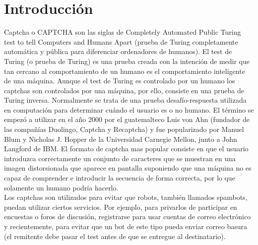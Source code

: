 \documentclass[conference]{IEEEtran}
\begin{document}
\section{Introducción}
Captcha o CAPTCHA son las siglas de Completely Automated Public Turing test to tell Computers and Humans Apart (prueba de Turing completamente automática y pública para diferenciar ordenadores de humanos). El test de Turing (o prueba de Turing) es una prueba creada con la intención de medir que tan cercano al comportamiento de un humano es el comportamiento inteligente de una máquina. Aunque el test de Turing es controlado por un humano los captchas son controlados por una máquina, por ello, consiste en una prueba de Turing inversa. Normalmente se trata de una prueba desafío-respuesta utilizada en computación para determinar cuándo el usuario es o no humano. El término se empezó a utilizar en el año 2000 por el guatemalteco Luis von Ahn (fundador de las compañías Duolingo, Captcha y Recaptcha) y fue popularizado por  Manuel Blum y Nicholas J. Hopper de la Universidad Carnegie Mellon, junto a John Langford de IBM. El formato de captcha mas popular consiste en que el usuario introduzca correctamente un conjunto de caracteres que se muestran en una imagen distorsionada que aparece en pantalla suponiendo que una máquina no es capaz de comprender e introducir la secuencia de forma correcta, por lo que solamente un humano podría hacerlo. \newline \\
Los captchas son utilizados para evitar que robots, también llamados spambots, puedan utilizar ciertos servicios. Por ejemplo, para privarlos de participar en encuestas o foros de discusión, registrarse para usar cuentas de correo electrónico y recientemente, para evitar que un bot de este tipo pueda enviar correo basura (el remitente debe pasar el test antes de que se entregue al destinatario).\newline \\
\end{document}
